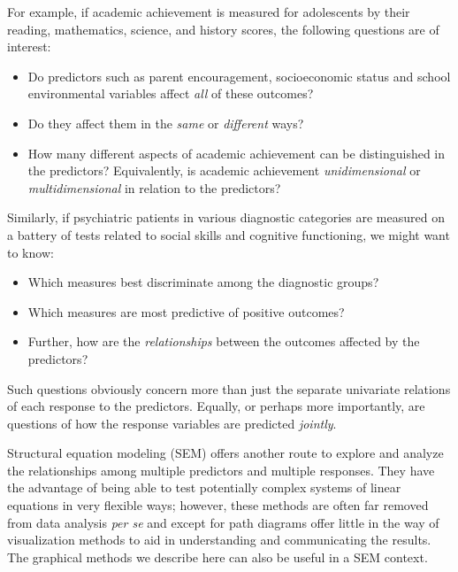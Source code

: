 \documentclass[
  letterpaper,
  10pt,
  krantz2]{krantz}
\begin{document}
For example, if academic achievement is measured for adolescents by
their reading, mathematics, science, and history scores, the following
questions are of interest:

\begin{itemize}
\item
  Do predictors such as parent encouragement, socioeconomic status and
  school environmental variables affect \emph{all} of these outcomes?
\item
  Do they affect them in the \emph{same} or \emph{different} ways?
\item
  How many different aspects of academic achievement can be
  distinguished in the predictors? Equivalently, is academic achievement
  \emph{unidimensional} or \emph{multidimensional} in relation to the
  predictors?
\end{itemize}

Similarly, if psychiatric patients in various diagnostic categories are
measured on a battery of tests related to social skills and cognitive
functioning, we might want to know:

\begin{itemize}
\item
  Which measures best discriminate among the diagnostic groups?
\item
  Which measures are most predictive of positive outcomes?
\item
  Further, how are the \emph{relationships} between the outcomes
  affected by the predictors?
\end{itemize}

Such questions obviously concern more than just the separate univariate
relations of each response to the predictors. Equally, or perhaps more
importantly, are questions of how the response variables are predicted
\emph{jointly}.

\begin{tcolorbox}[enhanced jigsaw, colback=white, titlerule=0mm, toprule=.15mm, opacityback=0, leftrule=.75mm, opacitybacktitle=0.6, left=2mm, arc=.35mm, colframe=quarto-callout-note-color-frame, breakable, bottomtitle=1mm, toptitle=1mm, title=\textcolor{quarto-callout-note-color}{\faInfo}\hspace{0.5em}{SEM}, rightrule=.15mm, bottomrule=.15mm, coltitle=black, colbacktitle=quarto-callout-note-color!10!white]

Structural equation modeling (SEM) offers another route to explore and
analyze the relationships among multiple predictors and multiple
responses. They have the advantage of being able to test potentially
complex systems of linear equations in very flexible ways; however,
these methods are often far removed from data analysis \emph{per se} and
except for path diagrams offer little in the way of visualization
methods to aid in understanding and communicating the results. The
graphical methods we describe here can also be useful in a SEM context.

\end{tcolorbox}
\end{document}
